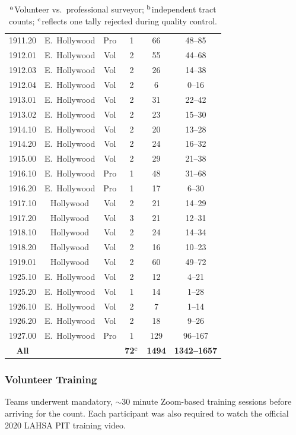 \documentclass[11pt,twocolumn]{article}
\def\Count{count}
\begin{document}
\begin{table}[t!]
{\begin{tabular}{cccccc}
1911.20 & E.~Hollywood & Pro & 1 & 66 & 48--85 \\
1912.01 & E.~Hollywood & Vol & 2 & 55 & 44--68 \\
1912.03 & E.~Hollywood & Vol & 2 & 26 & 14--38 \\
1912.04 & E.~Hollywood & Vol & 2 & 6 & 0--16 \\
1913.01 & E.~Hollywood & Vol & 2 & 31 & 22--42 \\
1913.02 & E.~Hollywood & Vol & 2 & 23 & 15--30 \\
1914.10 & E.~Hollywood & Vol & 2 & 20 & 13--28 \\
1914.20 & E.~Hollywood & Vol & 2 & 24 & 16--32 \\
1915.00 & E.~Hollywood & Vol & 2 & 29 & 21--38 \\
1916.10 & E.~Hollywood & Pro & 1 & 48 & 31--68 \\
1916.20 & E.~Hollywood & Pro & 1 & 17 & 6--30 \\
1917.10 & Hollywood & Vol & 2 & 21 & 14--29 \\
1917.20 & Hollywood & Vol & 3 & 21 & 12--31 \\
1918.10 & Hollywood & Vol & 2 & 24 & 14--34 \\
1918.20 & Hollywood & Vol & 2 & 16 & 10--23 \\
1919.01 & Hollywood & Vol & 2 & 60 & 49--72 \\
1925.10 & E.~Hollywood & Vol & 2 & 12 & 4--21 \\
1925.20 & E.~Hollywood & Vol & 1 & 14 & 1--28 \\
1926.10 & E.~Hollywood & Vol & 2 & 7 & 1--14 \\
1926.20 & E.~Hollywood & Vol & 2 & 18 & 9--26 \\
1927.00 & E.~Hollywood & Pro & 1 & 129 & 96--167\\
\cmidrule{1-6}
{\bf All} & & & {\bf 72}$^{\rm c}$ & {\bf 1494} & {\bf 1342--1657}
\\ \bottomrule
\end{tabular}
}
\caption*{$^{\rm a}$Volunteer vs.~professional surveyor; $^{\rm b}$independent 
		tract counts; $^{\rm c}$reflects one tally rejected during quality control.}
\label{tbl:tractStats}
\end{table}

\subsubsection{Volunteer Training}
\label{sec:training}

Teams underwent mandatory, $\sim$30 minute Zoom-based training sessions before arriving 
for the \Count. Each participant was also required to watch the official 2020 LAHSA PIT training 
video.%
\end{document}

